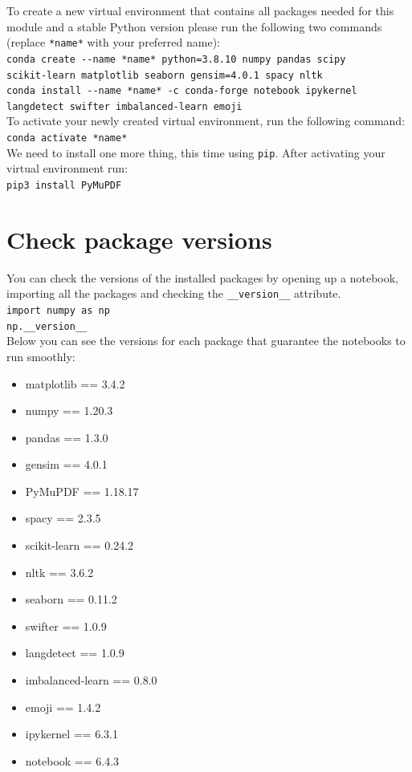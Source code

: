 \documentclass[12pt]{article}
\begin{document}
To create a new virtual environment that contains all packages needed for this module and a stable Python version please run the following two commands (replace \verb|*name*| with your preferred name): \\

\verb|conda create --name *name* python=3.8.10 numpy pandas scipy|\\
\indent \verb|scikit-learn matplotlib seaborn gensim=4.0.1 spacy nltk| \\

\verb|conda install --name *name* -c conda-forge notebook ipykernel| \\
\indent \verb|langdetect swifter imbalanced-learn emoji| \\

\noindent To activate your newly created virtual environment, run the following command: \\

\verb|conda activate *name*| \\

\noindent We need to install one more thing, this time using \verb|pip|. After activating your virtual environment run: \\

\verb|pip3 install PyMuPDF| \\


\vspace{-0.5cm}
\section{Check package versions}
You can check the versions of the installed packages by opening up a notebook, importing all the packages and checking the \verb|__version__| attribute. \\

\verb|import numpy as np| \\

\verb|np.__version__| \\

Below you can see the versions for each package that guarantee the notebooks to run smoothly:
\begin{itemize}
    \item matplotlib == 3.4.2
    \item numpy == 1.20.3
    \item pandas == 1.3.0
    \item gensim == 4.0.1
    \item PyMuPDF == 1.18.17
    \item spacy == 2.3.5
    \item scikit-learn == 0.24.2
    \item nltk == 3.6.2
    \item seaborn == 0.11.2
    \item swifter == 1.0.9
    \item langdetect == 1.0.9
    \item imbalanced-learn == 0.8.0
    \item emoji == 1.4.2
    \item ipykernel == 6.3.1
    \item notebook == 6.4.3
\end{itemize}
\end{document}
